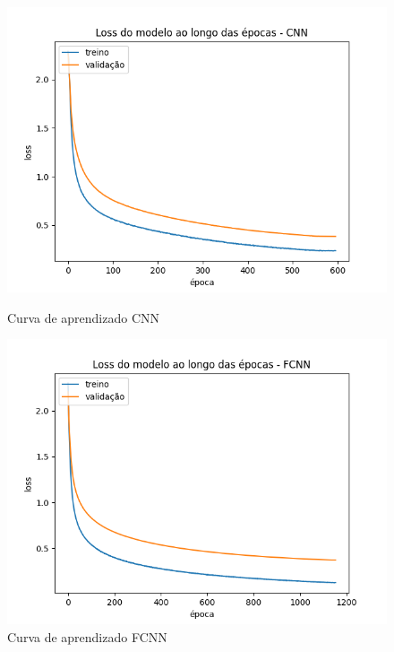 \documentclass[12pt]{article}
\begin{document}
\begin{figure}[H]
\centering
\begin{minipage}{0.5\textwidth}
  \centering
  \includegraphics[width=\textwidth]{../images/results_plt/cnn_loss_progress.png}
  \caption{Curva de aprendizado CNN}
  \label{fig:cnn_loss_progress}
\end{minipage}%
\hfill
\begin{minipage}{0.5\textwidth}
  \centering
  \includegraphics[width=\textwidth]{../images/results_plt/fcnn_loss_progress.png}
  \caption{Curva de aprendizado FCNN}
\label{fig:fcnn_loss_progress}
\end{minipage}
\end{figure}
\end{document}
